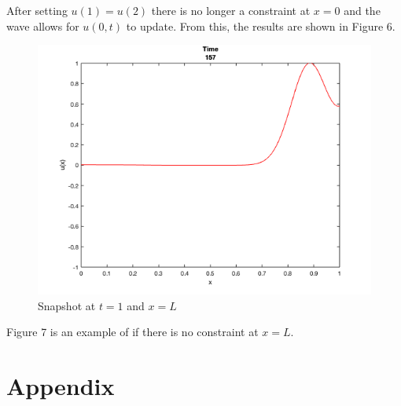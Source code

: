 \documentclass[12pt]{article}
\begin{document}
After setting $u(1) = u(2)$ there is no longer a constraint at $x = 0$ and the wave allows for $u(0, t)$ to update. From this, the results are shown in Figure 6.


\begin{figure}[h!]
\centering
\includegraphics[width=\textwidth]{problem_5_3.png}
\caption{Snapshot at $t = 1$ and $x = L$}
\end{figure}

Figure 7 is an example of if there is no constraint at $x = L$.

\clearpage


\section*{Appendix}
\end{document}
